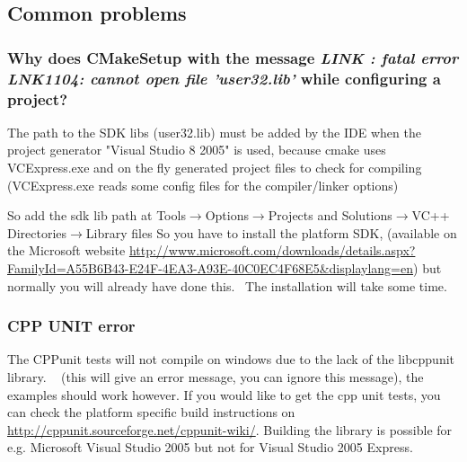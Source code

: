\documentclass[a4paper,10pt]{article}
\begin{document}
\subsection{Common problems}
\label{subsec:problems}

\subsubsection{Why does CMakeSetup with the message \emph{LINK : fatal error LNK1104: cannot open 
file 'user32.lib'} while configuring a project?}
The path to the SDK libs (user32.lib) must be added by the IDE when the 
project generator "Visual Studio 8 2005" is used, because cmake uses 
VCExpress.exe and on the fly generated project files to check for compiling 
(VCExpress.exe reads some config files for the compiler/linker options) 

So add the sdk lib path  at Tools$\rightarrow$Options$\rightarrow$Projects and Solutions$\rightarrow$VC++ Directories$\rightarrow$Library files
So you have to install the platform SDK, (available on the Microsoft website \url{http://www.microsoft.com/downloads/details.aspx?FamilyId=A55B6B43-E24F-4EA3-A93E-40C0EC4F68E5&displaylang=en}) but 
normally you will already have done this.  The installation will take some 
time.

\subsubsection{CPP UNIT error}
The CPPunit tests will not compile on windows due to the lack of the libcppunit  library.   (this will give an error message, you can ignore this message), the examples should work however.
If you would like to get the cpp unit tests, you can check the platform specific build instructions on \url{http://cppunit.sourceforge.net/cppunit-wiki/}. Building the library is possible for e.g. Microsoft Visual Studio 2005 but not for Visual Studio 2005 Express.
\end{document}
